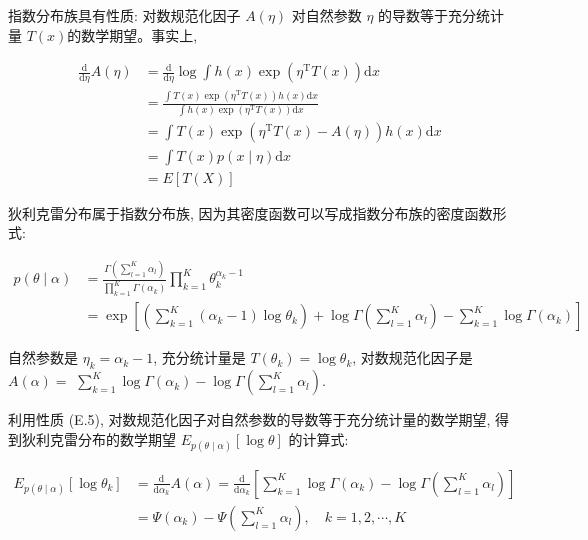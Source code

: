 \documentclass[10pt]{article}
\begin{document}
指数分布族具有性质: 对数规范化因子 $A(\eta)$ 对自然参数 $\eta$ 的导数等于充分统计量 $T(x)$的数学期望。事实上,


\begin{align*}
\frac{\mathrm{d}}{\mathrm{d} \eta} A(\eta) & =\frac{\mathrm{d}}{\mathrm{d} \eta} \log \int h(x) \exp \left(\eta^{\mathrm{T}} T(x)\right) \mathrm{d} x \\
& =\frac{\int T(x) \exp \left(\eta^{\mathrm{T}} T(x)\right) h(x) \mathrm{d} x}{\int h(x) \exp \left(\eta^{\mathrm{T}} T(x)\right) \mathrm{d} x} \\
& =\int T(x) \exp \left(\eta^{\mathrm{T}} T(x)-A(\eta)\right) h(x) \mathrm{d} x \\
& =\int T(x) p(x \mid \eta) \mathrm{d} x \\
& =E[T(X)] \tag{E.5}
\end{align*}


狄利克雷分布属于指数分布族, 因为其密度函数可以写成指数分布族的密度函数形式:


\begin{align*}
p(\theta \mid \alpha) & =\frac{\Gamma\left(\sum_{l=1}^{K} \alpha_{l}\right)}{\prod_{k=1}^{K} \Gamma\left(\alpha_{k}\right)} \prod_{k=1}^{K} \theta_{k}^{\alpha_{k}-1} \\
& =\exp \left[\left(\sum_{k=1}^{K}\left(\alpha_{k}-1\right) \log \theta_{k}\right)+\log \Gamma\left(\sum_{l=1}^{K} \alpha_{l}\right)-\sum_{k=1}^{K} \log \Gamma\left(\alpha_{k}\right)\right] \tag{E.6}
\end{align*}


自然参数是 $\eta_{k}=\alpha_{k}-1$, 充分统计量是 $T\left(\theta_{k}\right)=\log \theta_{k}$, 对数规范化因子是 $A(\alpha)=$ $\sum_{k=1}^{K} \log \Gamma\left(\alpha_{k}\right)-\log \Gamma\left(\sum_{l=1}^{K} \alpha_{l}\right)$.

利用性质 (E.5), 对数规范化因子对自然参数的导数等于充分统计量的数学期望, 得到狄利克雷分布的数学期望 $E_{p(\theta \mid \alpha)}[\log \theta]$ 的计算式:


\begin{align*}
E_{p(\theta \mid \alpha)}\left[\log \theta_{k}\right] & =\frac{\mathrm{d}}{\mathrm{d} \alpha_{k}} A(\alpha)=\frac{\mathrm{d}}{\mathrm{d} \alpha_{k}}\left[\sum_{k=1}^{K} \log \Gamma\left(\alpha_{k}\right)-\log \Gamma\left(\sum_{l=1}^{K} \alpha_{l}\right)\right] \\
& =\Psi\left(\alpha_{k}\right)-\Psi\left(\sum_{l=1}^{K} \alpha_{l}\right), \quad k=1,2, \cdots, K \tag{E.7}
\end{align*}
\end{document}
